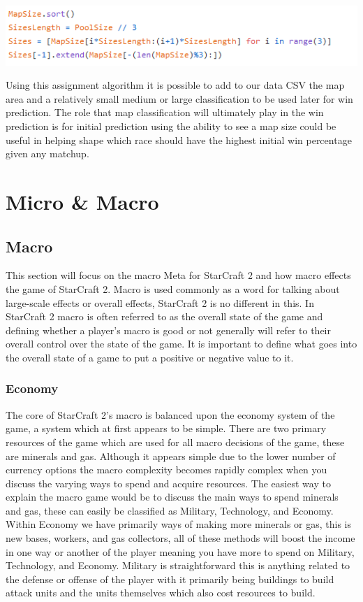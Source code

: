 \documentclass[a4paper,12pt]{report}
\begin{document}
\begin{center}
    \captionsetup{type=figure}
    \includegraphics[width=.8\linewidth]{media/MapSorter.png}
\end{center}

Using this assignment algorithm it is possible to add to our data CSV the map area and a relatively small medium or large classification to be used later for win prediction. The role that map classification will ultimately play in the win prediction is for initial prediction using the ability to see a map size could be useful in helping shape which race should have the highest initial win percentage given any matchup.

\section{Micro \& Macro}
\subsection{Macro}

This section will focus on the macro Meta for StarCraft 2 and how macro effects the game of StarCraft 2. Macro is used commonly as a word for talking about large-scale effects or overall effects, StarCraft 2 is no different in this. In StarCraft 2 macro is often referred to as the overall state of the game and defining whether a player’s macro is good or not generally will refer to their overall control over the state of the game. It is important to define what goes into the overall state of a game to put a positive or negative value to it.

\subsubsection{Economy}

The core of StarCraft 2’s macro is balanced upon the economy system of the game, a system which at first appears to be simple. There are two primary resources of the game which are used for all macro decisions of the game, these are minerals and gas. Although it appears simple due to the lower number of currency options the macro complexity becomes rapidly complex when you discuss the varying ways to spend and acquire resources. The easiest way to explain the macro game would be to discuss the main ways to spend minerals and gas, these can easily be classified as Military, Technology, and Economy. Within Economy we have primarily ways of making more minerals or gas, this is new bases, workers, and gas collectors, all of these methods will boost the income in one way or another of the player meaning you have more to spend on Military, Technology, and Economy. Military is straightforward this is anything related to the defense or offense of the player with it primarily being buildings to build attack units and the units themselves which also cost resources to build.
\end{document}
